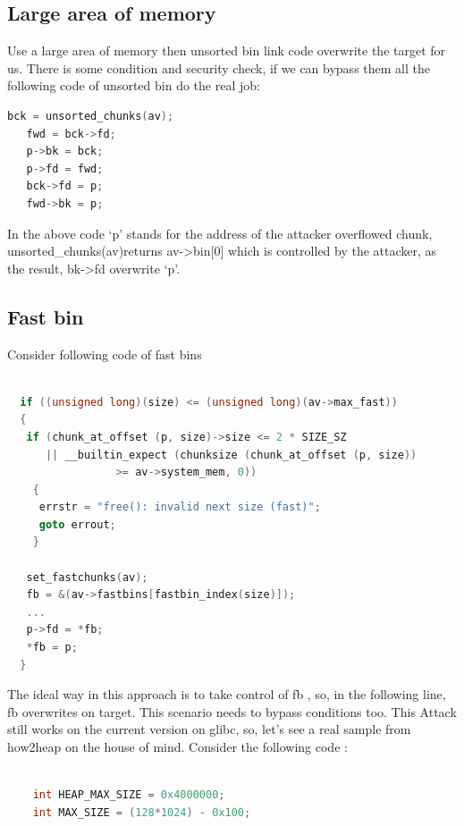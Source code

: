 \documentclass{masterthesis}
\newcommand*\libc{glibc}
\begin{document}
\subsection{Large area of memory}
Use a large area of memory then unsorted bin link code overwrite the target for us. There is some condition and security check, if we can bypass them all the following code of unsorted bin do the real job:
\begin{lstlisting}[language=c,frame=tlrb]
  bck = unsorted_chunks(av);
   fwd = bck->fd;
   p->bk = bck;
   p->fd = fwd;
   bck->fd = p;
   fwd->bk = p;
 \end{lstlisting}
In the above code ‘p’ stands for the address of the attacker overflowed chunk, unsorted\_chunks(av)returns av->bin[0] which is controlled by the attacker, as the result, bk->fd overwrite ‘p’.

\subsection{Fast bin}
Consider following code of fast bins
\begin{lstlisting}[language=c,frame=tlrb]

  if ((unsigned long)(size) <= (unsigned long)(av->max_fast))
  {
   if (chunk_at_offset (p, size)->size <= 2 * SIZE_SZ
      || __builtin_expect (chunksize (chunk_at_offset (p, size))
                 >= av->system_mem, 0))
    {
     errstr = "free(): invalid next size (fast)";
     goto errout;
    }

   set_fastchunks(av);
   fb = &(av->fastbins[fastbin_index(size)]);
   ...
   p->fd = *fb;
   *fb = p;
  }
 \end{lstlisting}
The ideal way in this approach is to take control of fb , so, in the following line, fb overwrites on target. This scenario needs to bypass conditions too. This Attack still works on the current version on \libc{}, so, let's see a real sample from how2heap on the house of mind. Consider the following code : 
\begin{lstlisting}[language=c,frame=tlrb]

	int HEAP_MAX_SIZE = 0x4000000;
	int MAX_SIZE = (128*1024) - 0x100;
\end{lstlisting}
\end{document}
